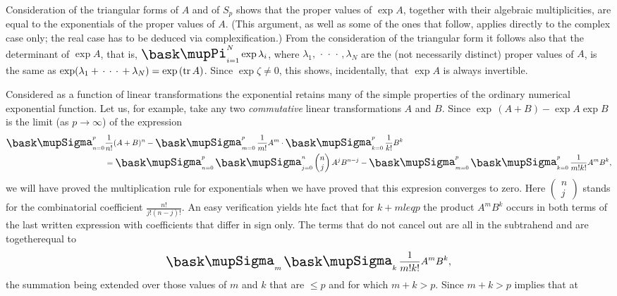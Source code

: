 Consideration of the triangular forms of \(A\) and of \(S_p\) shows that the
proper values of \(\exp A\), together with their algebraic multiplicities, are
equal to the exponentials of the proper values of \(A\). (This argument, as well
as some of the ones that follow, applies directly to the complex case only; the
real case has to be deduced via complexification.) From the consideration of the
triangular form it follows also that the determinant of \(\exp A\), that is,
\(\prodx_{i=1}^N \exp \lambda_i\), where \(\lambda_1, \,\cdot\,\cdot\,\cdot\,,
\lambda_N\) are the (not necessarily distinct) proper values of \(A\), is the
same as \(\exp (\lambda_1 + \,\cdot\,\cdot\,\cdot\, + \lambda_N) = \exp\,(\mathrm{tr}\,A)\). Since \(\exp \zeta \neq 0\), this shows, incidentally, that \(\exp A\) is
always invertible.

Considered as a function of linear transformations the exponential retains many
of the simple properties of the ordinary numerical exponential function. Let us,
for example, take any two \emph{commutative} linear transformations \(A\) and
\(B\). Since \(\exp\,(A+B) - \exp A \exp B\) is the limit (as \(p \to \infty\)) of
the expression
\begin{align*}
    \sumx_{n=0}^p &\frac{1}{n!} (A+B)^n - \sumx_{m=0}^p \frac{1}{m!} A^m \cdot \sumx_{k=0}^p \frac{1}{k!} B^k\\
    & = \sumx_{n=0}^p \sumx_{j=0}^n \begin{pmatrix} n \\j
    \end{pmatrix} A^j B^{n-j} - \sumx_{m=0}^p \sumx_{k=0}^p \frac{1}{m!k!}A^m B^k,
\end{align*}
we will have proved the multiplication rule for exponentials when we have proved
that this expresion converges to zero. Here \(\begin{pmatrix} n \\j
\end{pmatrix}\) stands for the combinatorial coefficient
\(\displaystyle\frac{n!}{j!(n-j)!}\). An easy verification yields hte fact that
for \(k + m leq p\) the product \(A^m B^k\) occurs in both terms of the last
written expression with coefficients that differ in sign only. The terms that do
not cancel out are all in the subtrahend and are togetherequal to
\begin{equation*}
    \sumx_m \sumx_k \frac{1}{m!k!} A^m B^k,
\end{equation*}
the summation being extended over those values of \(m\) and \(k\) that are
\(\leq p\) and for which \(m + k >  p\). Since \(m + k > p\) implies that at

